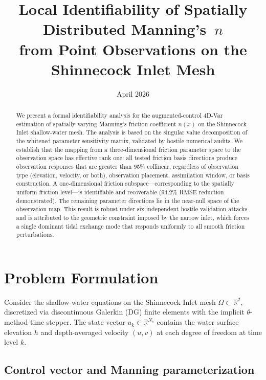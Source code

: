 \documentclass[11pt]{article}
\title{Local Identifiability of Spatially Distributed Manning's~$n$ \\
from Point Observations on the Shinnecock Inlet Mesh}
\author{}
\date{April 2026}
\theoremstyle{definition}
\begin{document}
\maketitle

\begin{abstract}
We present a formal identifiability analysis for the augmented-control
4D-Var estimation of spatially varying Manning's friction coefficient
$n(x)$ on the Shinnecock Inlet shallow-water mesh. The analysis is
based on the singular value decomposition of the whitened parameter
sensitivity matrix, validated by hostile numerical audits. We establish
that the mapping from a three-dimensional friction parameter space to
the observation space has effective rank one: all tested friction basis
directions produce observation responses that are greater than 95\%
collinear, regardless of observation type (elevation, velocity, or
both), observation placement, assimilation window, or basis
construction. A one-dimensional friction subspace---corresponding to
the spatially uniform friction level---is identifiable and recoverable
(94.2\% RMSE reduction demonstrated). The remaining parameter
directions lie in the near-null space of the observation map. This
result is robust under six independent hostile validation attacks
and is attributed to the geometric constraint imposed by the narrow
inlet, which forces a single dominant tidal exchange mode that
responds uniformly to all smooth friction perturbations.
\end{abstract}

\section{Problem Formulation}
\label{sec:formulation}

Consider the shallow-water equations on the Shinnecock Inlet mesh
$\Omega \subset \mathbb{R}^2$, discretized via discontinuous Galerkin
(DG) finite elements with the implicit $\theta$-method time stepper.
The state vector $u_k \in \mathbb{R}^{N_s}$ contains the water
surface elevation $h$ and depth-averaged velocity $(u,v)$ at each
degree of freedom at time level $k$.

\subsection{Control vector and Manning parameterization}
\end{document}
